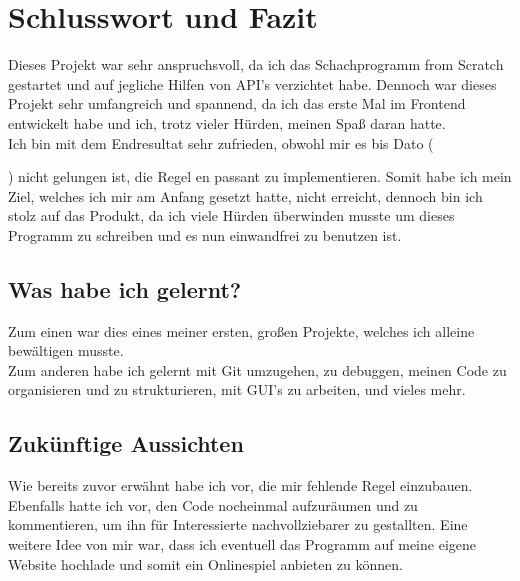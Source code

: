 \documentclass[a4paper, 10pt]{scrartcl}
\begin{document}
\section{Schlusswort und Fazit}
Dieses Projekt war sehr anspruchsvoll, da ich das Schachprogramm \glqq from Scratch\grqq{}
gestartet und auf jegliche Hilfen von API's verzichtet habe. Dennoch war dieses Projekt
sehr umfangreich und spannend, da ich das erste Mal im Frontend entwickelt habe und ich,
trotz vieler Hürden, meinen Spaß daran hatte. \\
Ich bin mit dem Endresultat sehr zufrieden, obwohl mir es bis Dato (\date{}) 
nicht gelungen ist, die Regel \glqq en passant\grqq{} zu implementieren.
Somit habe ich mein Ziel, welches ich mir am Anfang gesetzt hatte, nicht
erreicht, dennoch bin ich stolz auf das Produkt, da ich viele Hürden überwinden musste um
dieses Programm zu schreiben und es nun einwandfrei zu benutzen ist. 

\subsection{Was habe ich gelernt?}
Zum einen war dies eines meiner ersten, großen Projekte, welches
ich alleine bewältigen musste.\\
Zum anderen habe ich gelernt mit Git umzugehen, zu debuggen,
meinen Code zu organisieren und zu strukturieren, mit GUI's zu arbeiten,
und vieles mehr.


\subsection{Zukünftige Aussichten}
Wie bereits zuvor erwähnt habe ich vor, die mir fehlende Regel einzubauen. Ebenfalls hatte ich vor,
den Code nocheinmal aufzuräumen und zu kommentieren, um ihn für Interessierte nachvollziebarer
zu gestallten. 
Eine weitere Idee von mir war, dass ich eventuell das Programm auf meine eigene Website
hochlade und somit ein Onlinespiel anbieten zu können.
\end{document}
